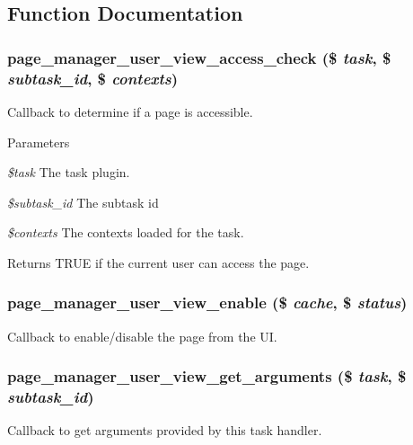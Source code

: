 \subsection{Function Documentation}
\hypertarget{user__view_8inc_ad31baaaec704d63b5a50df5b502b9d52}{
\subsubsection[{page\_\-manager\_\-user\_\-view\_\-access\_\-check}]{\setlength{\rightskip}{0pt plus 5cm}page\_\-manager\_\-user\_\-view\_\-access\_\-check (\$ {\em task}, \/  \$ {\em subtask\_\-id}, \/  \$ {\em contexts})}}
\label{user__view_8inc_ad31baaaec704d63b5a50df5b502b9d52}
Callback to determine if a page is accessible.


\begin{DoxyParams}{Parameters}
\item[{\em \$task}]The task plugin. \item[{\em \$subtask\_\-id}]The subtask id \item[{\em \$contexts}]The contexts loaded for the task. \end{DoxyParams}
\begin{DoxyReturn}{Returns}
TRUE if the current user can access the page. 
\end{DoxyReturn}
\hypertarget{user__view_8inc_a1dcdbc73cf9657503d8128cc9386a038}{
\subsubsection[{page\_\-manager\_\-user\_\-view\_\-enable}]{\setlength{\rightskip}{0pt plus 5cm}page\_\-manager\_\-user\_\-view\_\-enable (\$ {\em cache}, \/  \$ {\em status})}}
\label{user__view_8inc_a1dcdbc73cf9657503d8128cc9386a038}
Callback to enable/disable the page from the UI. \hypertarget{user__view_8inc_a9ef4fdfd423bb6f2703b453992bb0ccc}{
\subsubsection[{page\_\-manager\_\-user\_\-view\_\-get\_\-arguments}]{\setlength{\rightskip}{0pt plus 5cm}page\_\-manager\_\-user\_\-view\_\-get\_\-arguments (\$ {\em task}, \/  \$ {\em subtask\_\-id})}}
\label{user__view_8inc_a9ef4fdfd423bb6f2703b453992bb0ccc}
Callback to get arguments provided by this task handler.

